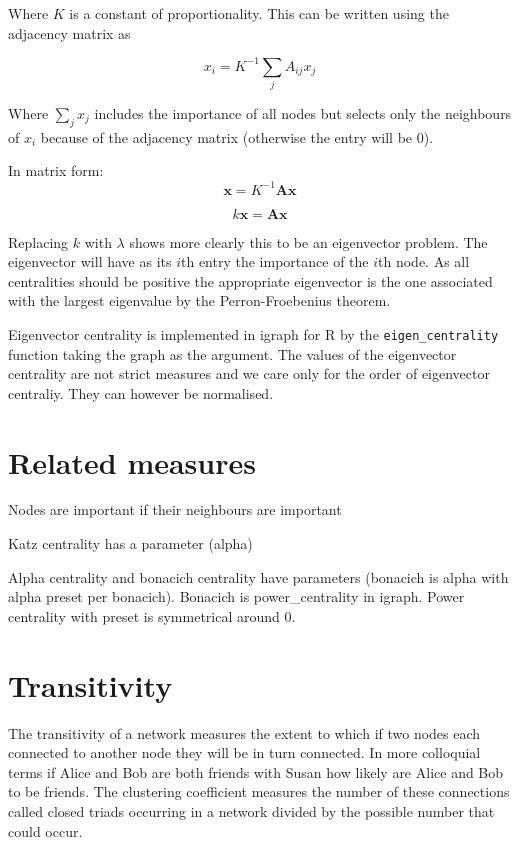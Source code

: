 Where $K$ is a constant of proportionality. This can be written using the adjacency matrix as

\begin{equation}
    x_i = K^{-1} \sum_j A_{ij} x_j
\end{equation}

Where $\sum_j x_j$ includes the importance of all nodes but selects only the neighbours of $x_i$ because of the adjacency matrix (otherwise the entry will be 0).

In matrix form:
\begin{equation}
    \mathbf{x}=K^{-1}\mathbf{Ax}
    \end{equation}
    
    \begin{equation}
         k\mathbf{x}=\mathbf{Ax}
    \end{equation}
  
  Replacing $k$ with $\lambda$ shows more clearly this to be an eigenvector problem. The eigenvector will have as its $i$th entry the importance of the $i$th node. As all centralities should be positive the appropriate eigenvector is the one associated with the largest eigenvalue by the Perron-Froebenius theorem. 
  
  Eigenvector centrality is implemented in igraph for R by the \texttt{eigen\_centrality} function taking the graph as the argument. The values of the eigenvector centrality are not strict measures and we care only for the order of eigenvector centraliy. They can however be normalised. 
  
 \section{Related measures}
\cite{bonacich1987power}
Nodes are important if their neighbours are important 

Katz centrality has a parameter (alpha)
    
Alpha centrality and bonacich centrality have parameters (bonacich is alpha with alpha preset per bonacich). Bonacich is power\_centrality in igraph. Power centrality with preset is symmetrical around 0.  





\section{Transitivity}
\label{sec:transitivity}
The transitivity of a network measures the extent to which if two nodes each connected to another node they will be in turn connected. In more colloquial terms if Alice and Bob are both friends with Susan how likely are Alice and Bob to be friends. The clustering coefficient measures the number of these connections called closed triads occurring in a network 
divided by the possible number that could occur.


